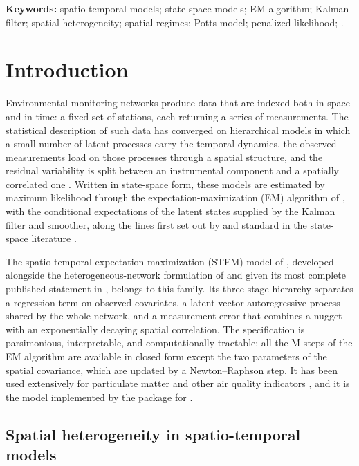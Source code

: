 \noindent\textbf{Keywords:} spatio-temporal models; state-space models; EM algorithm; Kalman filter; spatial heterogeneity; spatial regimes; Potts model; penalized likelihood; \Rlang.

\section{Introduction}\label{sec1}

Environmental monitoring networks produce data that are indexed both in space and in time: a fixed set of stations, each returning a series of measurements. The statistical description of such data has converged on hierarchical models in which a small number of latent processes carry the temporal dynamics, the observed measurements load on those processes through a spatial structure, and the residual variability is split between an instrumental component and a spatially correlated one \citep{CressieWikle2011}. Written in state-space form, these models are estimated by maximum likelihood through the expectation-maximization (EM) algorithm of \citet{DempsterLairdRubin1977}, with the conditional expectations of the latent states supplied by the Kalman filter and smoother, along the lines first set out by \citet{ShumwayStoffer1982} and standard in the state-space literature \citep{DurbinKoopman2012}.

The spatio-temporal expectation-maximization (STEM) model of \citet{FassoCameletti2007}, developed alongside the heterogeneous-network formulation of \citet{FassoCamelettiNicolis2007} and given its most complete published statement in \citet{FassoCameletti2010}, belongs to this family. Its three-stage hierarchy separates a regression term on observed covariates, a latent vector autoregressive process shared by the whole network, and a measurement error that combines a nugget with an exponentially decaying spatial correlation. The specification is parsimonious, interpretable, and computationally tractable: all the M-steps of the EM algorithm are available in closed form except the two parameters of the spatial covariance, which are updated by a Newton--Raphson step. It has been used extensively for particulate matter and other air quality indicators \citep{CamelettiEtAl2011}, and it is the model implemented by the \Stem{} package for \Rlang{} \citep{StemPackage}.

\subsection{Spatial heterogeneity in spatio-temporal models}\label{sec1:het}

